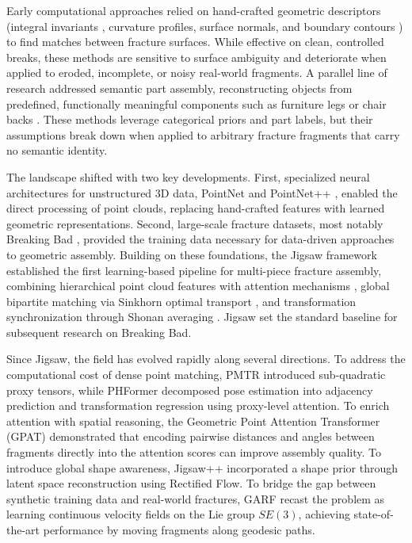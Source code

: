 Early computational approaches relied on hand-crafted geometric descriptors (integral invariants \cite{huang2006reassembling}, curvature profiles, surface normals, and boundary contours \cite{toler2010multi}) to find matches between fracture surfaces. While effective on clean, controlled breaks, these methods are sensitive to surface ambiguity and deteriorate when applied to eroded, incomplete, or noisy real-world fragments. A parallel line of research addressed semantic part assembly, reconstructing objects from predefined, functionally meaningful components such as furniture legs or chair backs \cite{Huang2020DGL, harish2022rgl, wu2020pq}. These methods leverage categorical priors and part labels, but their assumptions break down when applied to arbitrary fracture fragments that carry no semantic identity.

The landscape shifted with two key developments. First, specialized neural architectures for unstructured 3D data, PointNet \cite{qi2017pointnet} and PointNet++ \cite{qi2017pointnetplusplus}, enabled the direct processing of point clouds, replacing hand-crafted features with learned geometric representations. Second, large-scale fracture datasets, most notably Breaking Bad \cite{sellan2022breaking}, provided the training data necessary for data-driven approaches to geometric assembly. Building on these foundations, the Jigsaw framework \cite{lu2023jigsaw} established the first learning-based pipeline for multi-piece fracture assembly, combining hierarchical point cloud features with attention mechanisms \cite{vaswani2017attention}, global bipartite matching via Sinkhorn optimal transport \cite{cuturi2013sinkhorn}, and transformation synchronization through Shonan averaging \cite{dellaert2020shonan}. Jigsaw set the standard baseline for subsequent research on Breaking Bad.

Since Jigsaw, the field has evolved rapidly along several directions. To address the computational cost of dense point matching, PMTR \cite{lee20243d} introduced sub-quadratic proxy tensors, while PHFormer \cite{cui2024phformer} decomposed pose estimation into adjacency prediction and transformation regression using proxy-level attention. To enrich attention with spatial reasoning, the Geometric Point Attention Transformer (GPAT) \cite{Li2023GPAT} demonstrated that encoding pairwise distances and angles between fragments directly into the attention scores can improve assembly quality. To introduce global shape awareness, Jigsaw++ \cite{lu2024jigsawpp} incorporated a shape prior through latent space reconstruction using Rectified Flow. To bridge the gap between synthetic training data and real-world fractures, GARF \cite{Li2025GARF} recast the problem as learning continuous velocity fields on the Lie group $SE(3)$, achieving state-of-the-art performance by moving fragments along geodesic paths.

